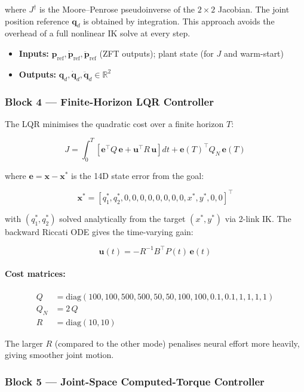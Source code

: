 \documentclass[11pt, a4paper]{article}
\begin{document}
where $J^{\dagger}$ is the Moore--Penrose pseudoinverse of the $2\times 2$
Jacobian.  The joint position reference $\bm{q}_d$ is obtained by integration.
This approach avoids the overhead of a full nonlinear IK solve at every step.

\begin{itemize}
  \item \textbf{Inputs:} $\bm{p}_{\mathrm{ref}}, \dot{\bm{p}}_{\mathrm{ref}},
        \ddot{\bm{p}}_{\mathrm{ref}}$ (ZFT outputs); plant state (for $J$ and warm-start)
  \item \textbf{Outputs:} $\bm{q}_d, \dot{\bm{q}}_d, \ddot{\bm{q}}_d \in \mathbb{R}^2$
\end{itemize}

\subsubsection*{Block 4 — Finite-Horizon LQR Controller}

The LQR minimises the quadratic cost over a finite horizon $T$:

\[
\boxed{
J = \int_0^T \left[\bm{e}^{\top} Q\, \bm{e}
                 + \bm{u}^{\top} R\, \bm{u}\right] dt
  + \bm{e}(T)^{\top} Q_N\, \bm{e}(T)
}
\]

where $\bm{e} = \bm{x} - \bm{x}^{*}$ is the 14D state error from the goal:

\[
\bm{x}^{*} =
[q_1^*, q_2^*, 0, 0, 0, 0, 0, 0, 0, 0, x^*, y^*, 0, 0]^{\top}
\]

with $(q_1^*, q_2^*)$ solved analytically from the target $(x^*, y^*)$ via
2-link IK.  The backward Riccati ODE gives the time-varying gain:

\[
\bm{u}(t) = -R^{-1}B^{\top}P(t)\,\bm{e}(t)
\]

\paragraph{Cost matrices:}
\begin{align*}
Q &= \mathrm{diag}(100, 100, 500, 500, 50, 50, 100, 100, 0.1, 0.1, 1, 1, 1, 1) \\
Q_N &= 2\,Q \\
R &= \mathrm{diag}(10, 10)
\end{align*}

The larger $R$ (compared to the other mode) penalises neural effort more
heavily, giving smoother joint motion.

\subsubsection*{Block 5 — Joint-Space Computed-Torque Controller}
\end{document}

